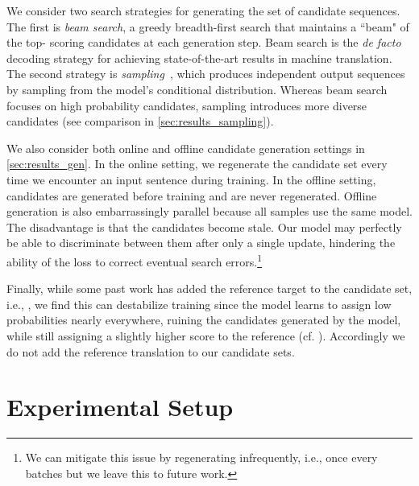 \documentclass[11pt,a4paper]{article}
\begin{document}
We consider two search strategies for generating the set of candidate sequences.
The first is \emph{beam search}, a greedy breadth-first search that maintains a ``beam" of the top- scoring candidates at each generation step.
Beam search is the \emph{de facto} decoding strategy for achieving state-of-the-art results in machine translation.
The second strategy is \emph{sampling}~\citep{chatterjee}, which produces  independent output sequences by sampling from the model's conditional distribution.
Whereas beam search focuses on high probability candidates, sampling introduces more diverse candidates (see comparison in \textsection\ref{sec:results_sampling}).

We also consider both online and offline candidate generation settings in \textsection\ref{sec:results_gen}.
In the online setting, we regenerate the candidate set every time we encounter an input sentence  during training.
In the offline setting, candidates are generated before training and are never regenerated. Offline generation is also embarrassingly parallel because all samples use the same model.
The disadvantage is that the candidates become stale.
Our model may perfectly be able to discriminate between them after only a single update, hindering the ability of the loss to correct eventual search errors.\footnote{We can mitigate this issue by regenerating infrequently, i.e., once every  batches but we leave this to future work.}

Finally, while some past work has added the reference target to the candidate set, i.e., , we find this can destabilize training since the model learns to assign low probabilities nearly everywhere, ruining the candidates generated by the model, while still assigning a slightly higher score to the reference (cf. \citet{shen2016mrt}).
Accordingly we do not add the reference translation to our candidate sets.

\section{Experimental Setup}
\label{sec:expsetup}
\end{document}
